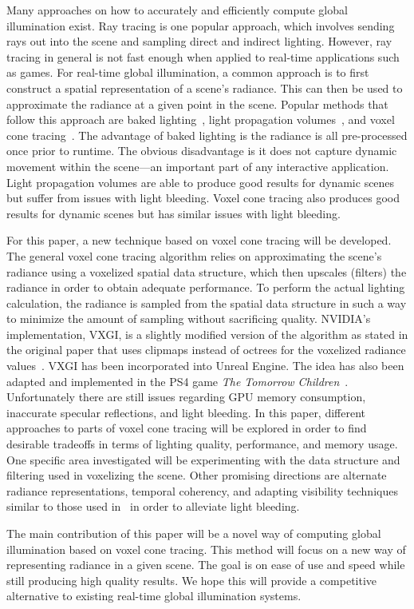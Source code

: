 Many approaches on how to accurately and efficiently compute global illumination exist. Ray tracing is one popular approach, which involves sending rays out into the scene and sampling direct and indirect lighting. However, ray tracing in general is not fast enough when applied to real-time applications such as games. For real-time global illumination, a common approach is to first construct a spatial representation of a scene's radiance. This can then be used to approximate the radiance at a given point in the scene. Popular methods that follow this approach are baked lighting~\cite{Sloan:2002:PRT:566654.566612}, light propagation volumes~\cite{Kaplanyan:2010:CLP:1730804.1730821}, and voxel cone tracing~\cite{crassin2011interactive}. The advantage of baked lighting is the radiance is all pre-processed once prior to runtime. The obvious disadvantage is it does not capture dynamic movement within the scene---an important part of any interactive application. Light propagation volumes are able to produce good results for dynamic scenes but suffer from issues with light bleeding. Voxel cone tracing also produces good results for dynamic scenes but has similar issues with light bleeding.

For this paper, a new technique based on voxel cone tracing will be developed. The general voxel cone tracing algorithm relies on approximating the scene's radiance using a voxelized spatial data structure, which then upscales (filters) the radiance in order to obtain adequate performance. To perform the actual lighting calculation, the radiance is sampled from the spatial data structure in such a way to minimize the amount of sampling without sacrificing quality. NVIDIA's implementation, VXGI, is a slightly modified version of the algorithm as stated in the original paper that uses clipmaps instead of octrees for the voxelized radiance values~\cite{nvidiavxgi}. VXGI has been incorporated into Unreal Engine. The idea has also been adapted and implemented in the PS4 game \textit{The Tomorrow Children}~\cite{mclaren2016cascaded}.  Unfortunately there are still issues regarding GPU memory consumption, inaccurate specular reflections, and light bleeding. In this paper, different approaches to parts of voxel cone tracing will be explored in order to find desirable tradeoffs in terms of lighting quality, performance, and memory usage. One specific area investigated will be experimenting with the data structure and filtering used in voxelizing the scene. Other promising directions are alternate radiance representations, temporal coherency, and adapting visibility techniques similar to those used in~\cite{McGuire:2017:RGI:3023368.3023378} in order to alleviate light bleeding.

The main contribution of this paper will be a novel way of computing global illumination based on voxel cone tracing. This method will focus on a new way of representing radiance in a given scene. The goal is on ease of use and speed while still producing high quality results. We hope this will provide a competitive alternative to existing real-time global illumination systems.
\fi